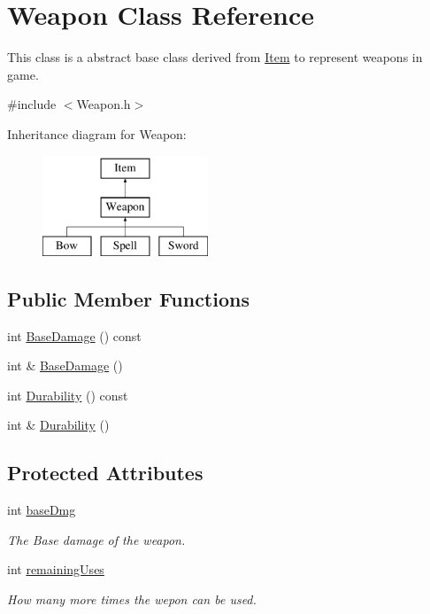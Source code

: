 \hypertarget{classWeapon}{\section{Weapon Class Reference}
\label{classWeapon}
}


This class is a abstract base class derived from \hyperlink{classItem}{Item} to represent weapons in game.  




{\ttfamily \#include $<$Weapon.\-h$>$}

Inheritance diagram for Weapon\-:\begin{figure}[H]
\begin{center}
\leavevmode
\includegraphics[height=3.000000cm]{classWeapon}
\end{center}
\end{figure}
\subsection*{Public Member Functions}
\begin{DoxyCompactItemize}
\item 
int \hyperlink{classWeapon_a8a98e2d7fa882c4e0bb1f58394ee8a70}{Base\-Damage} () const 
\item 
int \& \hyperlink{classWeapon_a45379f8f35327420270443f54910f83d}{Base\-Damage} ()
\item 
int \hyperlink{classWeapon_aa67ac6bc8b0e4a59211ff6c8a36286bc}{Durability} () const 
\item 
int \& \hyperlink{classWeapon_ac7f3223ff4dcf411ee0f17d70dedc6fb}{Durability} ()
\end{DoxyCompactItemize}
\subsection*{Protected Attributes}
\begin{DoxyCompactItemize}
\item 
int \hyperlink{classWeapon_a81c4f950298060a4b91c4170fc128631}{base\-Dmg}
\begin{DoxyCompactList}\small\item\em The Base damage of the weapon. \end{DoxyCompactList}\item 
int \hyperlink{classWeapon_abbc826be5477aa791910f871d76a1da2}{remaining\-Uses}
\begin{DoxyCompactList}\small\item\em How many more times the wepon can be used. \end{DoxyCompactList}\end{DoxyCompactItemize}
